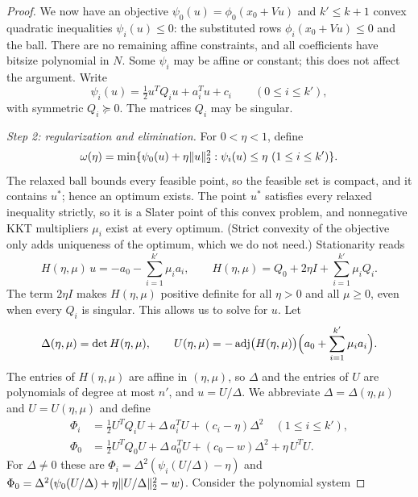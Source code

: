 \begin{proof}
We now have an objective $\psi_0(u)=\phi_0(x_0+Vu)$ and $k'\le k+1$
convex quadratic inequalities $\psi_i(u)\le0$: the substituted rows
$\phi_i(x_0+Vu)\le0$ and the ball. There are no remaining affine
constraints, and all coefficients have bitsize polynomial in $N$. Some
$\psi_i$ may be affine or constant; this does not affect the argument.
Write
\[
 \psi_i(u)=\tfrac12u^TQ_iu+a_i^Tu+c_i\qquad(0\le i\le k'),
\]
with symmetric $Q_i\succeq0$. The matrices $Q_i$ may be singular.

\emph{Step 2: regularization and elimination.}
For $0<\eta<1$, define
\begin{equation}\label{eq:regularized}
 \omega(\eta)=\min\{\psi_0(u)+\eta\lVert u\rVert_2^2:
                         \psi_i(u)\le\eta\ (1\le i\le k')\}.
\end{equation}
The relaxed ball bounds every feasible point, so the feasible set is
compact, and it contains $u^*$; hence an optimum exists. The point $u^*$
satisfies every relaxed inequality strictly, so it is a Slater point of
this convex problem, and nonnegative KKT multipliers $\mu_i$ exist at
every optimum. (Strict convexity of the objective only adds uniqueness of
the optimum, which we do not need.) Stationarity reads
\begin{equation}\label{eq:matrixstationarity}
 H(\eta,\mu)\,u=-a_0-\sum_{i=1}^{k'}\mu_i a_i,\qquad
 H(\eta,\mu)=Q_0+2\eta I+\sum_{i=1}^{k'}\mu_iQ_i.
\end{equation}
The term $2\eta I$ makes $H(\eta,\mu)$ positive definite for all $\eta>0$
and all $\mu\ge0$, even when every $Q_i$ is singular. This allows us to
solve for $u$. Let
\[
 \Delta(\eta,\mu)=\det H(\eta,\mu),\qquad
 U(\eta,\mu)=-\operatorname{adj}\bigl(H(\eta,\mu)\bigr)
             \Bigl(a_0+\sum_{i=1}^{k'}\mu_ia_i\Bigr).
\]
The entries of $H(\eta,\mu)$ are affine in $(\eta,\mu)$, so $\Delta$ and
the entries of $U$ are polynomials of degree at most $n'$, and
$u=U/\Delta$. We abbreviate $\Delta=\Delta(\eta,\mu)$ and $U=U(\eta,\mu)$
and define
\begin{align}
 \Phi_i&=\tfrac12U^TQ_iU+\Delta\,a_i^TU
                  +(c_i-\eta)\Delta^2\quad(1\le i\le k'),
                  \label{eq:Gconstraint}\\
 \Phi_0&=\tfrac12U^TQ_0U+\Delta\,a_0^TU
                  +(c_0-w)\Delta^2+\eta\,U^TU.
                  \label{eq:Gobjective}
\end{align}
For $\Delta\ne0$ these are
$\Phi_i=\Delta^2(\psi_i(U/\Delta)-\eta)$ and
$\Phi_0=\Delta^2(\psi_0(U/\Delta)+\eta\lVert U/\Delta\rVert_2^2-w)$.
Consider the polynomial system

\end{proof}
